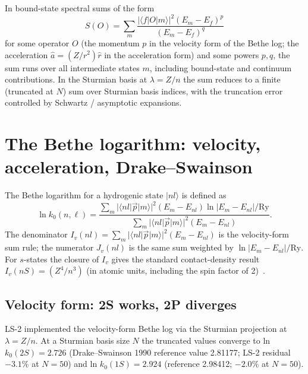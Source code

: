\documentclass[11pt]{article}
\begin{document}
In bound-state spectral sums of the form
\begin{equation}
\label{eq:bs_sum_general}
S(O) = \sum_m \frac{|\langle f | O | m \rangle|^2 (E_m - E_f)^p}{(E_m - E_f)^q}
\end{equation}
for some operator $O$ (the momentum $p$ in the velocity form of the
Bethe log; the acceleration $\hat{a} = (Z/r^2) \hat{r}$ in the
acceleration form) and some powers $p, q$, the sum runs over all
intermediate states $m$, including bound-state and continuum
contributions.  In the Sturmian basis at $\lambda = Z/n$ the sum
reduces to a finite (truncated at $N$) sum over Sturmian basis
indices, with the truncation error controlled by Schwartz / asymptotic
expansions.

\section{The Bethe logarithm: velocity, acceleration, Drake--Swainson}
\label{sec:drake}

The Bethe logarithm for a hydrogenic state $|nl\rangle$ is defined as
\begin{equation}
\label{eq:bethe_log_def}
\ln k_0(n, \ell) = \frac{\sum_m |\langle nl | \vec{p} | m \rangle|^2
(E_m - E_{nl}) \ln |E_m - E_{nl}| / \mathrm{Ry}}
{\sum_m |\langle nl | \vec{p} | m \rangle|^2 (E_m - E_{nl})}.
\end{equation}
The denominator $I_v(nl) = \sum_m |\langle nl | \vec{p} | m \rangle|^2
(E_m - E_{nl})$ is the velocity-form sum rule; the numerator
$J_v(nl)$ is the same sum weighted by $\ln |E_m - E_{nl}| / \mathrm{Ry}$.
For $s$-states the closure of $I_v$ gives the standard contact-density
result $I_v(nS) = (Z^4/n^3)$ (in atomic units, including the spin
factor of 2)~\cite{drake_swainson}.

\subsection{Velocity form: 2S works, 2P diverges}

LS-2 implemented the velocity-form Bethe log via the Sturmian
projection at $\lambda = Z/n$.  At a Sturmian basis size $N$ the
truncated values converge to ln $k_0(2S) = 2.726$ (Drake--Swainson
1990 reference value 2.81177; LS-2 residual $-3.1\%$ at $N = 50$)
and ln $k_0(1S) = 2.924$ (reference 2.98412; $-2.0\%$ at $N = 50$).
\end{document}
